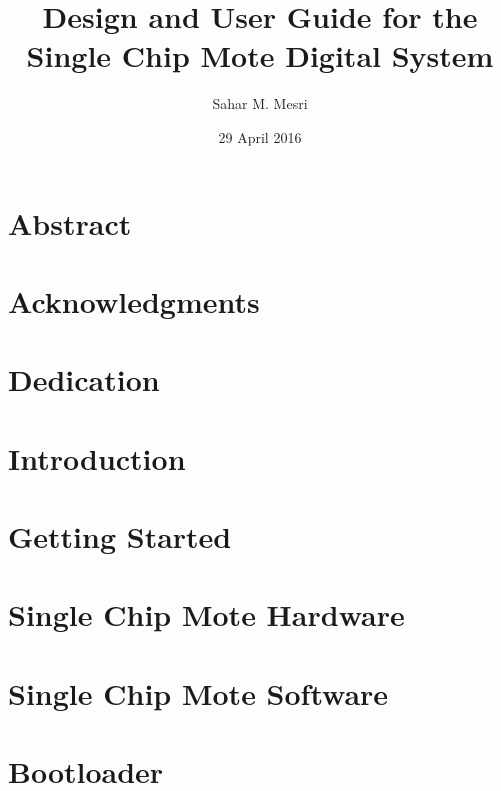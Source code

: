 \documentclass[12pt]{report}
\begin{document}
\title{
	{Design and User Guide for the Single Chip Mote Digital System}\\
}
\author{Sahar M. Mesri}
\date{29 April 2016}

\maketitle

\chapter*{Abstract}


\chapter*{Acknowledgments}


{\let\clearpage\relax \chapter*{Dedication}}


\tableofcontents

\chapter{Introduction} \label{intro}


\chapter{Getting Started} \label{getting-started}


\chapter{Single Chip Mote Hardware} \label{hw}


\chapter{Single Chip Mote Software} \label{sw}


\chapter{Bootloader} \label{bootloading}

\end{document}
